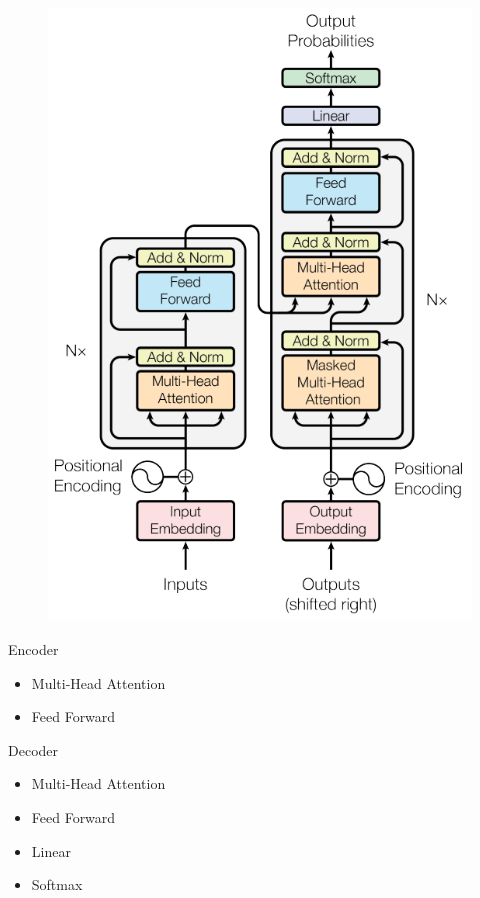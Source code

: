 \documentclass[xcolor=dvipsnames, professionalfonts, aspectratio=169, 11pt]{beamer}
\begin{document}
\begin{persian}
\begin{frame}
\begin{multicols}{2}
		\begin{figure}
			\vspace{0em}
			\includegraphics[height=0.8\textheight]{img/img6.png}
		\end{figure}
	
	\begin{enumerate}
		\begin{latin}
			\item Encoder
			\begin{itemize}
				\item Multi-Head Attention
				\item Feed Forward
			\end{itemize}
			\item Decoder
			\begin{itemize}
				\item Multi-Head Attention
				\item Feed Forward
				\item Linear
				\item Softmax
			\end{itemize}
		\end{latin}
	\end{enumerate}
	

\end{multicols}
\end{frame}
\end{persian}
\end{document}
